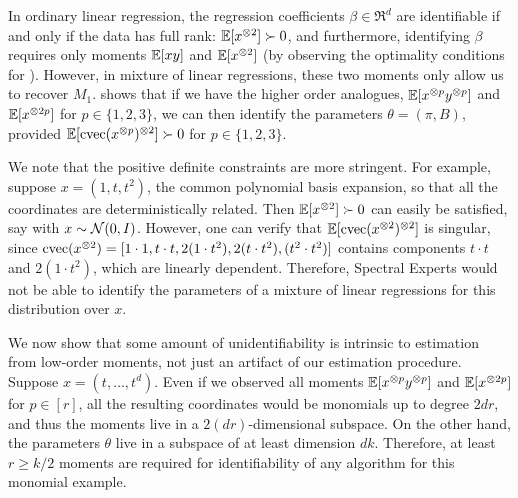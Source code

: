 In ordinary linear regression, the regression coefficients $\beta \in \Re^d$ are
identifiable if and only if the data has full
rank: $\operatorname{\mathbb{E}}[x^{\otimes 2}] \succ 0$,
and furthermore, identifying $\beta$ requires only moments
$\operatorname{\mathbb{E}}[xy]$ and $\operatorname{\mathbb{E}}[x^{\otimes 2}]$ (by observing the optimality conditions for ).
However, in mixture of linear regressions, these two moments only allow us to recover $M_1$.
 shows that if we have the higher order analogues,
$\operatorname{\mathbb{E}}[x^{\otimes p}y^{\otimes p}]$ and $\operatorname{\mathbb{E}}[x^{\otimes 2p}]$ for $p \in \{1,2,3\}$,
we can then identify the parameters $\theta = (\pi, B)$,
provided $\operatorname{\mathbb{E}}[\operatorname{cvec}(x^{\otimes p})^{\otimes 2}] \succ 0$ for $p \in \{1,2,3\}$.

We note that the positive definite constraints are more stringent.
For example, suppose $x = (1, t, t^2)$,
the common polynomial basis expansion, so that all the coordinates are deterministically related.
Then $\operatorname{\mathbb{E}}[x^{\otimes 2}] \succ 0$ can easily be satisfied, say with $x \sim \mathcal{N}(0, I)$.
However, one can verify that $\operatorname{\mathbb{E}}[\operatorname{cvec}(x^{\otimes 2})^{\otimes 2}]$ is singular,
since $\operatorname{cvec}(x^{\otimes 2}) = [1 \cdot 1, t\cdot t, 2(1 \cdot t^2), 2(t \cdot t^2), (t^2 \cdot t^2)]$ contains
components $t \cdot t$ and $2(1 \cdot t^2)$, which are linearly dependent.
Therefore, Spectral Experts would not be able to identify the parameters of a mixture of
linear regressions for this distribution over $x$.

We now show that some amount of unidentifiability is intrinsic to estimation from low-order moments,
not just an artifact of our estimation procedure.
Suppose $x = (t, \dots, t^d)$.
Even if we observed all moments
$\operatorname{\mathbb{E}}[x^{\otimes p}y^{\otimes p}]$ and $\operatorname{\mathbb{E}}[x^{\otimes 2p}]$ for $p \in [r]$,
all the resulting coordinates would be monomials up to degree $2dr$,
and thus the moments live in a $2(dr)$-dimensional subspace.
On the other hand, the parameters $\theta$ live in a subspace of at least dimension $dk$.
Therefore, at least $r \ge k/2$ moments are required for identifiability of any
algorithm for this monomial example.
